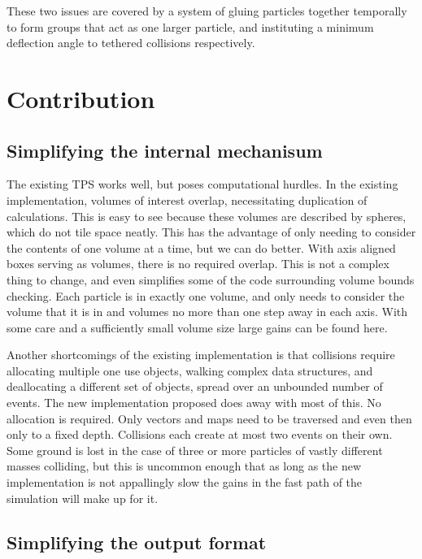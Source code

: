 \documentclass[conference]{IEEEtran}
\begin{document}
These two issues are covered by a system of gluing particles together temporally to form groups that act as one larger particle, and instituting a minimum deflection angle to tethered collisions respectively.

\section{Contribution}

\subsection{Simplifying the internal mechanisum}

The existing TPS works well, but poses computational hurdles. In the existing implementation, volumes of interest overlap, necessitating duplication of calculations. This is easy to see because these volumes are described by spheres, which do not tile space neatly. This has the advantage of only needing to consider the contents of one volume at a time, but we can do better. With axis aligned boxes serving as volumes, there is no required overlap. This is not a complex thing to change, and even simplifies some of the code surrounding volume bounds checking. Each particle is in exactly one volume, and only needs to consider the volume that it is in and volumes no more than one step away in each axis. With some care and a sufficiently small volume size large gains can be found here.

Another shortcomings of the existing implementation is that collisions require allocating multiple one use objects, walking complex data structures, and deallocating a different set of objects, spread over an unbounded number of events. The new implementation proposed does away with most of this. No allocation is required. Only vectors and maps need to be traversed and even then only to a fixed depth. Collisions each create at most two events on their own. Some ground is lost in the case of three or more particles of vastly different masses colliding, but this is uncommon enough that as long as the new implementation is not appallingly slow the gains in the fast path of the simulation will make up for it.

\subsection{Simplifying the output format}
\end{document}
